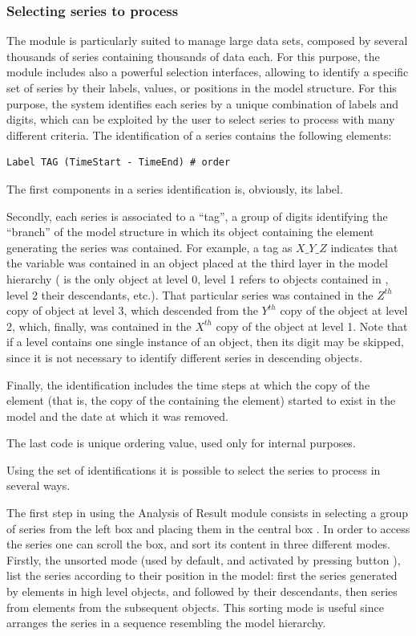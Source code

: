 \documentclass [11pt,a4paper] {book}
\begin{document}
\subsubsection{Selecting series to process}

The module is particularly suited to manage large data sets, composed by several thousands of series containing thousands of data each. For this purpose, the module includes also a powerful selection interfaces, allowing to identify a specific set of series by their labels, values, or positions in the model structure. For this purpose, the system identifies each series by a unique combination of labels and digits, which can be exploited by the user to select series to process with many different criteria. The identification of a series contains the following elements:

\begin{verbatim}
Label TAG (TimeStart - TimeEnd) # order
\end{verbatim}

The first components in a series identification is, obviously, its label. 

Secondly, each series is associated to a ``tag'', a group of digits identifying the ``branch'' of the model structure in which its object containing the element generating the series was contained. For example, a tag as $X\_Y\_Z$ indicates that the variable was contained in an object placed at the third layer in the model hierarchy ( is the only object at level 0, level 1 refers to objects contained in , level 2 their descendants, etc.). That particular series was contained in the $Z^{th}$ copy of object at level 3, which descended from the $Y^{th}$ copy of the object at level 2, which, finally, was contained in the $X^{th}$ copy of the object at level 1. Note that if a level contains one single instance of an object, then its digit may be skipped, since it is not necessary to identify different series in descending objects.

Finally, the identification includes the time steps at which the copy of the element (that is, the copy of the containing the element) started to exist in the model and the date at which it was removed.

The last code is unique ordering value, used only for internal purposes.

Using the set of identifications it is possible to select the series to process in several ways. 


The first step in using the Analysis of Result module consists in selecting a group of series from the left box  and placing them in the central box . In order to access the series one can scroll the  box, and sort its content in three different modes. Firstly, the unsorted mode (used by default, and activated by pressing button ), list the series according to their position in the model: first the series generated by elements in high level objects, and followed by their descendants, then series from elements from the subsequent objects. This sorting mode is useful since arranges the series in a sequence resembling the model hierarchy.
\end{document}
